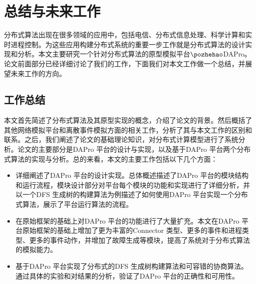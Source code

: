 \chapter{总结与未来工作}
    分布式算法出现在很多领域的应用中，包括电信、分布式信息处理、科学计算和实时进程控制。为这些应用构建分布式系统的重要一步工作就是分布式算法的设计实现和分析。本文主要研究一个针对分布式算法的原型模拟平台$\pozhehao$DAPro。论文前面部分已经详细讨论了我们的工作，下面我们对本文工作做一个总结，并展望未来工作的方向。

    \section{工作总结}
    本文首先简述了分布式算法及其原型实现的概念，介绍了论文的背景。然后概括了其他网络模拟平台和离散事件模拟方面的相关工作，分析了其与本文工作的区别和联系。之后，我们阐述了论文的基础理论知识，对分布式计算模型进行了系统分析。论文的主要部分是DAPro 平台的设计与实现，以及基于DAPro 平台两个分布式算法的实现与分析。总的来看，本文的主要工作包括以下几个方面：
    \begin{itemize}
      \item 详细阐述了DAPro 平台的设计实现。总体概述描述了DAPro 平台的模块结构和运行流程，模块设计部分对平台每个模块的功能和实现进行了详细分析，并以一个DFS 生成树的构建算法为例描述了如何使用DAPro 平台实现一个分布式算法，展示了平台运行算法的流程。
      \item 在原始框架的基础上对DAPro 平台的功能进行了大量扩充。本文在DAPro 平台原始框架的基础上增加了更为丰富的Connector 类型、更多的事件和进程类型、更多的事件动作，并增加了故障生成等模块，提高了系统对于分布式算法的模拟能力。
      \item 基于DAPro 平台实现了分布式的DFS 生成树构建算法和可容错的协商算法。通过具体的实验和对结果的分析，验证了DAPro 平台的正确性和可用性。
    \end{itemize}

